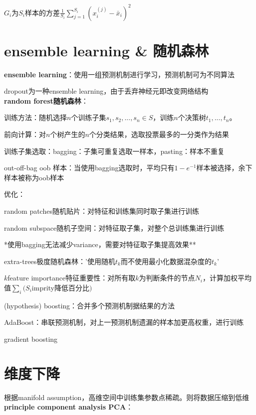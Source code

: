 \documentclass[UTF8]{ctexart}
\begin{document}
  \quad $G_i$为$S_i$样本的方差$\frac{1}{S_i}\sum_{j=1}^{S_i}(x_i^{(j)} - \bar{x}_i)^2$

\section{ensemble learning \& 随机森林}
\noindent \textbf{ensemble learning}：使用一组预测机制进行学习，预测机制可为不同算法

  dropout为一种ensemble learning，由于丢弃神经元即改变网络结构\\
\textbf{random forest随机森林}：

  训练方法：随机选择$n$个训练子集$s_1, s_2, ..., s_n \in S$，训练$n$个决策树$t_1, ..., t_n$。
  
  前向计算：对$n$个树产生的$n$个分类结果，选取投票最多的一分类作为结果
  
  训练子集选取：bagging：子集可重复选取一样本，pasting：样本不重复
  
  \quad out-off-bag oob 样本：当使用bagging选取时，平均只有$1-e^{-1}$样本被选择，余下样本被称为oob样本

  优化：

  \quad random patches随机贴片：对特征和训练集同时取子集进行训练
  
  \quad random subspace随机子空间：对特征取子集，对整个总训练集进行训练

  \quad \quad **使用bagging无法减少variance，需要对特征取子集提高效果**
  
  \quad extra-trees极度随机森林：'使用随机$t_k$而不使用最小化数据混杂度的$t_k$'
  
  \quad $k$feature importance特征重要性：对所有取$k$为判断条件的节点$N_i$，计算加权平均值$\sum_i(S_i$imprity降低百分比$)$
  
  \quad (hypothesis) boosting：合并多个预测机制据结果的方法
  
  \quad \quad AdaBoost：串联预测机制，对上一预测机制遗漏的样本加更高权重，进行训练

  \quad \quad gradient boosting


\section{维度下降}
\noindent 根据manifold assumption，高维空间中训练集参数点稀疏。则将数据压缩到低维\\
\textbf{principle component analysis PCA}：
\end{document}
